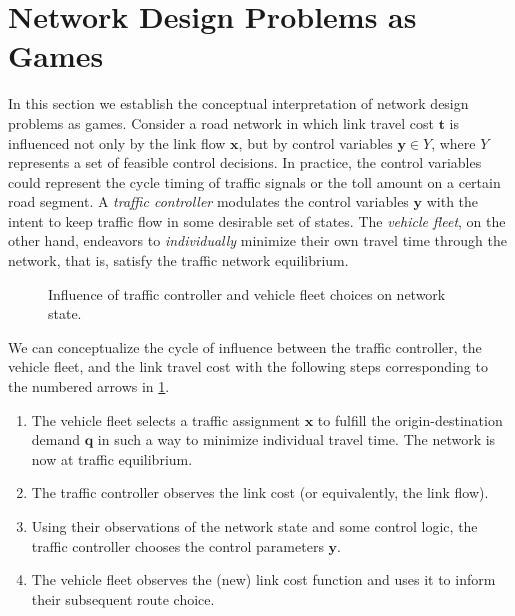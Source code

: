 \section{Network Design Problems as Games}

In this section we establish the conceptual interpretation of network design problems as games.
Consider a road network in which link travel cost $\mathbf{t}$ is influenced not only by the link flow $\mathbf{x}$, but by control variables $\mathbf{y}\in Y$, where $Y$ represents a set of feasible control decisions.
In practice, the control variables could represent the cycle timing of traffic signals or the toll amount on a certain road segment.
A \textit{traffic controller} modulates the control variables $\mathbf{y}$ with the intent to keep traffic flow in some desirable set of states.
The \textit{vehicle fleet}, on the other hand, endeavors to \textit{individually} minimize their own travel time through the network, that is, satisfy the traffic network equilibrium.

\begin{figure}[!ht]
    \centering
    \caption{Influence of traffic controller and vehicle fleet choices on network state.}
    \label{fig:influence-diagram}
\end{figure}

We can conceptualize the cycle of influence between the traffic controller, the vehicle fleet, and the link travel cost with the following steps corresponding to the numbered arrows in \cref{fig:influence-diagram}.

\begin{enumerate}
    \item The vehicle fleet selects a traffic assignment $\mathbf{x}$ to fulfill the origin-destination demand $\mathbf{q}$ in such a way to minimize individual travel time.
    The network is now at traffic equilibrium.
    \item The traffic controller observes the link cost (or equivalently, the link flow).
    \item Using their observations of the network state and some control logic, the traffic controller chooses the control parameters $\mathbf{y}$.
    \item The vehicle fleet observes the (new) link cost function and uses it to inform their subsequent route choice.
\end{enumerate}

